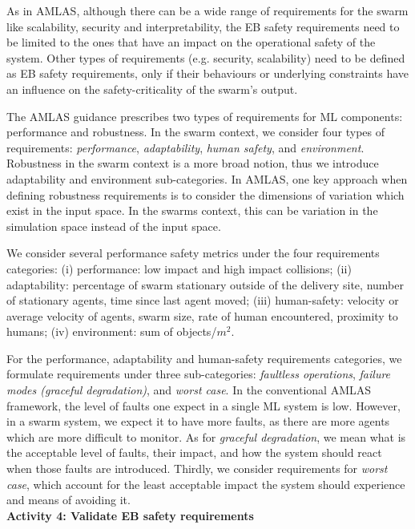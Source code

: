 \documentclass[lettersize,journal]{IEEEtran}
\begin{document}
As in AMLAS, although there can be a wide range of requirements for the swarm like scalability, security and interpretability, the EB safety requirements need to be limited to the ones that have an impact on the operational safety of the system. 
Other types of requirements (e.g. security, scalability) need to be defined as EB safety requirements, only if their behaviours or underlying constraints have an influence on the safety-criticality of the swarm's output.  

The AMLAS guidance prescribes two types of requirements for ML components: performance and robustness. 
In the swarm context, we consider four types of requirements: \emph{performance}, \emph{adaptability}, \emph{human safety}, and \emph{environment}.
Robustness in the swarm context is a more broad notion, thus we introduce adaptability and environment sub-categories. 
In AMLAS, one key approach when defining robustness requirements is to consider the dimensions of variation which exist in the input space. In the swarms context, this can be variation in the simulation space instead of the input space. 

We consider several performance safety metrics under the four requirements categories: 
(i) performance: low impact and high impact collisions; 
(ii) adaptability: percentage of swarm stationary outside of the delivery site, number of stationary agents, time since last agent moved; 
(iii) human-safety: velocity or average velocity of agents, swarm size, rate of human encountered, proximity to humans;
(iv) environment: sum of objects/$m^2$.

For the performance, adaptability and human-safety requirements categories, we formulate requirements under three sub-categories: \emph{faultless operations}, \emph{failure modes (graceful degradation)}, and \emph{worst case}. 
In the conventional AMLAS framework, the level of faults one expect in a single ML system is low. 
However, in a swarm system, we expect it to have more faults, as there are more agents which are more difficult to monitor. 
As for \emph{graceful degradation}, we mean what is the acceptable level of faults, their impact, and how the system should react when those faults are introduced. 
Thirdly, we consider requirements for \emph{worst case}, which account for the least acceptable impact the system should experience and means of avoiding it. \\

\noindent \textbf{Activity 4: Validate EB safety requirements}
\end{document}
